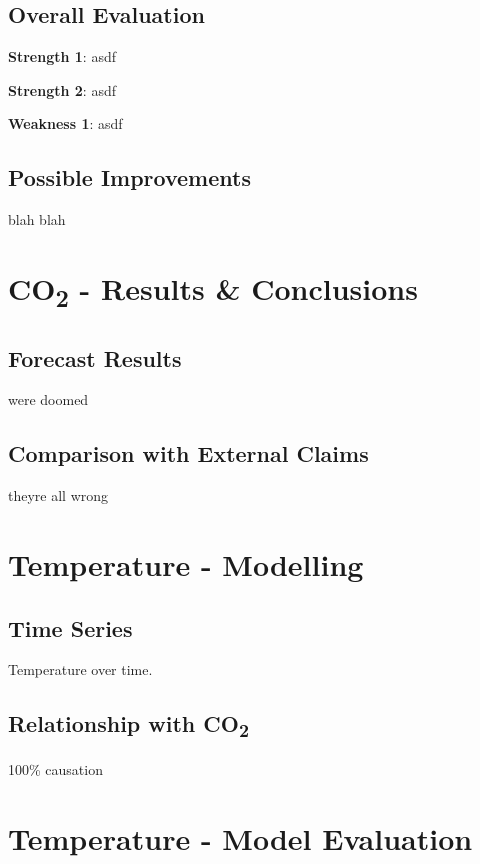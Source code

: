 \documentclass{mcmthesis}
\begin{document}
    \subsection{Overall Evaluation}

    \noindent\textbf{Strength 1}: asdf

    \noindent\textbf{Strength 2}: asdf

    \noindent\textbf{Weakness 1}: asdf


    \subsection{Possible Improvements}
    blah blah

    \newpage



    \section{CO\textsubscript{2} - Results \& Conclusions}

    \subsection{Forecast Results}
    we\textquotesingle re doomed


    \subsection{Comparison with External Claims}
    they\textquotesingle re all wrong



    \section{Temperature - Modelling}

    \subsection{Time Series}
    Temperature over time.


    \subsection{Relationship with CO\textsubscript{2}}
    100\% causation



    \section{Temperature - Model Evaluation}
\end{document}
